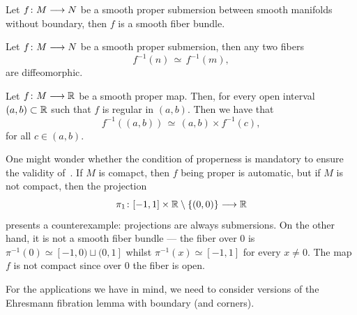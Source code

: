 \documentclass{amsbook}
\begin{document}
\begin{proposition}\label{ap:: prop: Ehresmann fibration no boundary}\cite{Ehr50}
Let $f\colon M \longrightarrow N$ be a smooth proper submersion between smooth manifolds without boundary, then $f$ is a smooth fiber bundle.
\end{proposition}

\begin{cor}
    Let $f\colon M \longrightarrow N$ be a smooth proper submersion, then any two fibers \[f^{-1}(n) \, \simeq \, f^{-1}(m),\]
    are diffeomorphic.
\end{cor}
\begin{cor}
    Let $f\colon M \longrightarrow \mathbb R$ be a smooth proper map. Then, for every open interval $(a,b) \subset \mathbb R$ such that $f$ is regular in $(a,b)$. Then we have that 
    \begin{equation}
        f^{-1}\left((a,b)\right) \, \simeq \, (a,b) \times f^{-1}(c),
    \end{equation}
    for all $c \in (a,b)$. 
\end{cor}

\begin{remark}
    One might wonder whether the condition of properness is mandatory to ensure the validity of~. If $M$ is comapct, then $f$ being proper is automatic, but if $M$ is not compact, then the projection \[\pi_1 \colon [-1,1]\times \mathbb R\setminus \{(0,0)\} \longrightarrow \mathbb R\] presents a counterexample: projections are always submersions. On the other hand, it is not a smooth fiber bundle — the fiber over $0$ is $\pi^{-1}(0) \simeq [-1,0) \sqcup (0,1]$ whilst $\pi^{-1}(x) \simeq [-1,1]$ for every $x\neq 0$. The map $f$ is not compact since over $0$ the fiber is open. 
\end{remark}

For the applications we have in mind, we need to consider versions of the Ehresmann fibration lemma with boundary (and corners).
\end{document}
